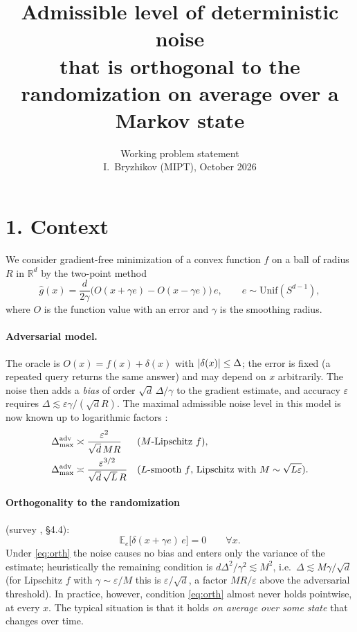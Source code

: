 \documentclass[10pt,a4paper]{article}
\title{\textbf{Admissible level of deterministic noise\\ that is orthogonal to the randomization on average over a Markov state}}
\author{Working problem statement\\ I.~Bryzhikov (MIPT), October 2026}
\date{}
\newcommand{\E}{\mathbb E}\newcommand{\R}{\mathbb R}
\newcommand{\Dmax}{\Delta_{\max}}
\theoremstyle{definition}\newtheorem{definition}{Definition}
\begin{document}
\sloppy
\maketitle
\vspace{-1.5em}

\section*{1. Context}
We consider gradient-free minimization of a convex function $f$ on a ball of radius $R$ in $\R^d$ by the two-point method
\[
\hat g(x)=\frac{d}{2\gamma}\big(O(x+\gamma e)-O(x-\gamma e)\big)\,e,\qquad e\sim\mathrm{Unif}(S^{d-1}),
\]
where $O$ is the function value with an error and $\gamma$ is the smoothing radius.

\paragraph{Adversarial model.} The oracle is $O(x)=f(x)+\delta(x)$ with $\lvert \delta(x)\rvert\le\Delta$; the error is fixed (a repeated query returns the same answer) and may depend on $x$ arbitrarily. The noise then adds a \emph{bias} of order $\sqrt d\,\Delta/\gamma$ to the gradient estimate, and accuracy $\varepsilon$ requires $\Delta\lesssim\varepsilon\gamma/(\sqrt d R)$. The maximal admissible noise level in this model is now known up to logarithmic factors \cite{pasechnyuk,risteski}:
\begin{align*}
\Dmax^{\rm adv}&\asymp\frac{\varepsilon^2}{\sqrt d\,MR} && \text{($M$-Lipschitz $f$)},\\
\Dmax^{\rm adv}&\asymp\frac{\varepsilon^{3/2}}{\sqrt d\,\sqrt L\,R} && \text{($L$-smooth $f$, Lipschitz with $M\sim\sqrt{L\varepsilon}$)}.
\end{align*}

\paragraph{Orthogonality to the randomization} (survey \cite{survey}, \S4.4):
\begin{equation}\label{eq:orth}
\E_e\big[\delta(x+\gamma e)\,e\big]=0\qquad\forall x .
\end{equation}
Under \eqref{eq:orth} the noise causes no bias and enters only the variance of the estimate; heuristically the remaining condition is $d\Delta^2/\gamma^2\lesssim M^2$, i.e.\ $\Delta\lesssim M\gamma/\sqrt d$ (for Lipschitz $f$ with $\gamma\sim\varepsilon/M$ this is $\varepsilon/\sqrt d$, a factor $MR/\varepsilon$ above the adversarial threshold). In practice, however, condition \eqref{eq:orth} almost never holds pointwise, at every $x$. The typical situation is that it holds \emph{on average over some state} that changes over time.
\end{document}
